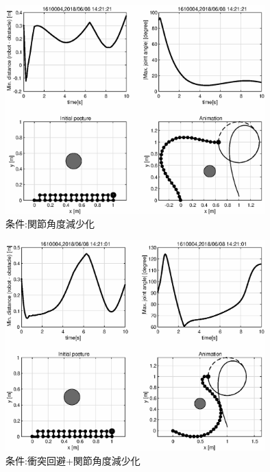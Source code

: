\documentclass[a4paper,11pt,titlepage]{jsarticle}
\begin{document}
{\begin{figure}[H]
  \begin{center}
    \includegraphics[width = 10cm]{画像/eps_冗長_関節角度減少化_結果}
    \caption{条件:関節角度減少化}
    \label{関節角度減少化}
  \end{center}
\end{figure}

\begin{figure}[H]
  \begin{center}
    \includegraphics[width = 10cm]{画像/eps_冗長_衝突回避+関節角度減少化_結果}
    \caption{条件:衝突回避+関節角度減少化}
    \label{衝突回避+関節角度減少化}
  \end{center}
\end{figure}

}
\end{document}

